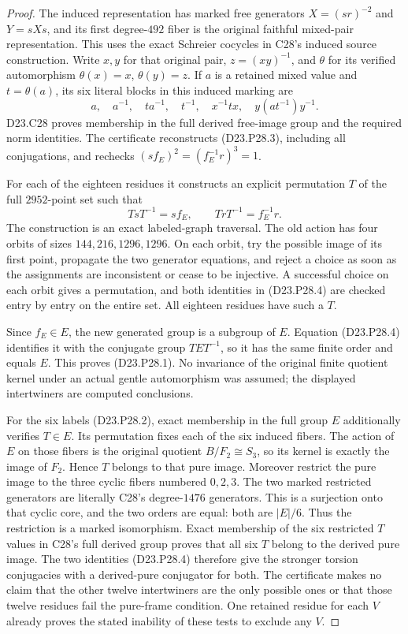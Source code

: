 \begin{proof}
The induced representation has marked free generators
$X=(sr)^{-2}$ and $Y=sXs$, and its first degree-$492$
fiber is the original faithful mixed-pair representation.
This uses the exact Schreier cocycles in C28's induced
source construction. Write $x,y$ for that original pair,
$z=(xy)^{-1}$, and $\theta$ for its verified automorphism
$\theta(x)=x$, $\theta(y)=z$. If $a$ is a retained mixed
value and $t=\theta(a)$, its six literal blocks in this
induced marking are
\[
 a,\quad a^{-1},\quad ta^{-1},\quad t^{-1},\quad
 x^{-1}tx,\quad y(at^{-1})y^{-1}.
                                                        \tag{D23.P28.3}
\]
D23.C28 proves membership in the full derived free-image
group and the required norm identities. The certificate
reconstructs (D23.P28.3), including all conjugations,
and rechecks $(sf_E)^2=(f_E^{-1}r)^3=1$.

For each of the eighteen residues it constructs an
explicit permutation $T$ of the full $2952$-point set
such that
\[
                  TsT^{-1}=sf_E,\qquad
                  TrT^{-1}=f_E^{-1}r.                    \tag{D23.P28.4}
\]
The construction is an exact labeled-graph traversal.
The old action has four orbits of sizes
$144,216,1296,1296$. On each orbit, try the possible
image of its first point, propagate the two generator
equations, and reject a choice as soon as the assignments
are inconsistent or cease to be injective. A successful
choice on each orbit gives a permutation, and both
identities in (D23.P28.4) are checked entry by entry on
the entire set. All eighteen residues have such a $T$.

Since $f_E\in E$, the new generated group is a subgroup
of $E$. Equation (D23.P28.4) identifies it with the
conjugate group $TET^{-1}$, so it has the same finite
order and equals $E$. This proves (D23.P28.1).
No invariance of the original finite quotient kernel
under an actual gentle automorphism was assumed; the
displayed intertwiners are computed conclusions.

For the six labels (D23.P28.2), exact membership in the
full group $E$ additionally verifies $T\in E$. Its
permutation fixes each of the six induced fibers. The
action of $E$ on those fibers is the original quotient
$B/F_2\cong S_3$, so its kernel is exactly the image
of $F_2$. Hence $T$ belongs to that pure image.
Moreover restrict the pure image to the three cyclic
fibers numbered $0,2,3$. The two marked restricted
generators are literally C28's degree-$1476$ generators.
This is a surjection onto that cyclic core, and the
two orders are equal: both are $|E|/6$.
Thus the restriction is a marked isomorphism. Exact
membership of the six restricted $T$ values in C28's
full derived group proves that all six $T$ belong
to the derived pure image. The two identities
(D23.P28.4) therefore give the stronger torsion
conjugacies with a derived-pure conjugator for both.
The certificate makes no claim that the other
twelve intertwiners are the only possible ones or that
those twelve residues fail the pure-frame condition.
One retained residue for each $V$ already proves the
stated inability of these tests to exclude any $V$.


\end{proof}
